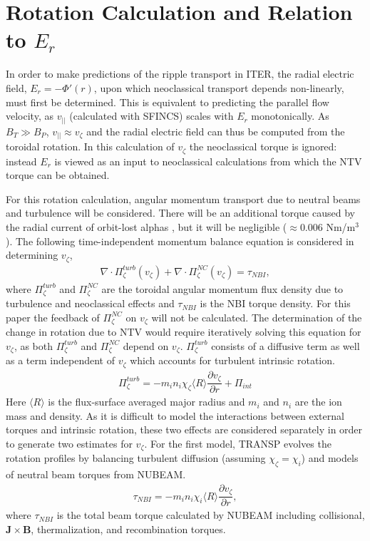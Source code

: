 \documentclass{article}
\newcommand{\partder}[2]{\dfrac{\partial  #1}{\partial  #2}} %
\begin{document}
\FloatBarrier

\section{Rotation Calculation and Relation to $E_r$}\label{rotation}

In order to make predictions of the ripple transport in ITER, the radial electric field, $E_r = - \Phi'(r) $, upon which neoclassical transport depends non-linearly, must first be determined. This is equivalent to predicting the parallel flow velocity, as $v_{||}$ (calculated with SFINCS) scales with $E_r$ monotonically. As $B_T \gg B_P$, $v_{||} \approx v_{\zeta}$ and the radial electric field can thus be computed from the toroidal rotation. In this calculation of $v_{\zeta}$ the neoclassical torque is ignored: instead $E_r$ is viewed as an input to neoclassical calculations from which the NTV torque can be obtained. 

For this rotation calculation, angular momentum transport due to neutral beams and turbulence will be considered. There will be an additional torque caused by the radial current of orbit-lost alphas \cite{Rosenbluth1996}, but it will be negligible ($\approx 0.006$ Nm/m$^3$). The following time-independent momentum balance equation is considered in determining $v_{\zeta}$,
\begin{gather}
\nabla \cdot \Pi_{\zeta}^{turb}(v_{\zeta}) + \nabla \cdot \Pi_{\zeta}^{NC}(v_{\zeta}) = \tau_{NBI},
\end{gather}
where $\Pi^{turb}_{\zeta}$ and $\Pi^{NC}_{\zeta}$ are the toroidal angular momentum flux density due to turbulence and neoclassical effects and $\tau_{NBI}$ is the NBI torque density. For this paper the feedback of $\Pi_{\zeta}^{NC}$ on $v_{\zeta}$ will not be calculated. The determination of the change in rotation due to NTV would require iteratively solving this equation for $v_{\zeta}$, as both $\Pi_{\zeta}^{turb}$ and $\Pi_{\zeta}^{NC}$ depend on $v_{\zeta}$. $\Pi_{\zeta}^{turb}$ consists of a diffusive term as well as a term independent of $v_{\zeta}$ which accounts for turbulent intrinsic rotation.
\begin{gather}
\Pi_{\zeta}^{turb} = -m_i n_i \chi_{\zeta} \langle R \rangle\partder{v_{\zeta}}{r} + \Pi_{int}
\end{gather}
Here $\langle R \rangle$ is the flux-surface averaged major radius and $m_i$ and $n_i$ are the ion mass and density. As it is difficult to model the interactions between external torques and intrinsic rotation, these two effects are considered separately in order to generate two estimates for $v_{\zeta}$. For the first model, TRANSP evolves the rotation profiles by balancing turbulent diffusion (assuming $\chi_{\zeta} = \chi_{i}$) and models of neutral beam torques from NUBEAM. 
\begin{gather}
\tau_{NBI} = -m_i n_i \chi_{i} \langle R \rangle \partder{v_{\zeta}}{r},
\end{gather}
where $\tau_{NBI}$ is the total beam torque calculated by NUBEAM including collisional, $\bm{J} \times \bm{B}$, thermalization, and recombination torques.
\end{document}
